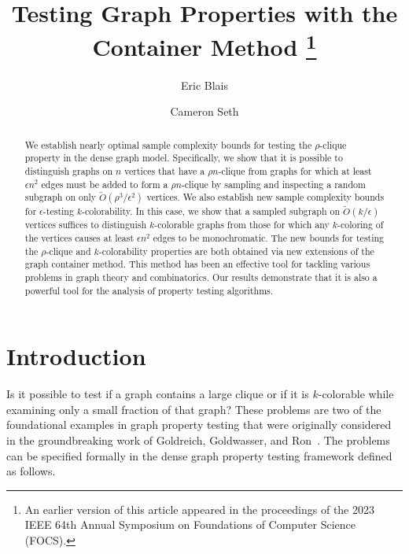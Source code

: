 \documentclass[11pt]{article}
\title{Testing Graph Properties with the Container Method \footnote{An earlier version of this article appeared in the proceedings of the 2023 IEEE 64th Annual Symposium on Foundations of Computer Science (FOCS).}}
\author{Eric Blais}
\author{Cameron Seth}
\affil{University of Waterloo}
\begin{document}
\maketitle

\begin{abstract}
We establish nearly optimal sample complexity bounds for testing the $\rho$-clique property in the dense graph model. Specifically, we show that it is possible to distinguish graphs on $n$ vertices that have a $\rho n$-clique from graphs for which at least $\epsilon n^2$ edges must be added to form a $\rho n$-clique by sampling and inspecting a random subgraph on only $\tilde{O}(\rho^3/\epsilon^2)$ vertices. We also establish new sample complexity bounds for $\epsilon$-testing $k$-colorability. In this case, we show that a sampled subgraph on $\tilde{O}(k/\epsilon)$ vertices suffices to distinguish $k$-colorable graphs from those for which any $k$-coloring of the vertices causes at least $\epsilon n^2$ edges to be monochromatic. The new bounds for testing the $\rho$-clique and $k$-colorability properties are both obtained via new extensions of the graph container method. This method has been an effective tool for tackling various problems in graph theory and combinatorics. Our results demonstrate that it is also a powerful tool for the analysis of property testing algorithms. 
\end{abstract}

\section{Introduction}

Is it possible to test if a graph contains a large clique or if it is $k$-colorable while examining only a small fraction of that graph? These problems are two of the foundational examples in graph property testing that were originally considered in the groundbreaking work of Goldreich, Goldwasser, and Ron~\cite{goldreichPropertyTesting1998}. The problems can be specified formally in the dense graph property testing framework defined as follows.
\end{document}
